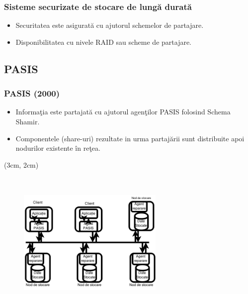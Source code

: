 \documentclass{beamer}
\theoremstyle{definition}
\begin{document}
\begin{frame}
    \frametitle{Sisteme securizate de stocare de lung\u{a} durat\u{a}}
    \begin{itemize}
        \item Securitatea este asigurat\u{a} cu ajutorul schemelor de partajare.
        \pause
        \item Disponibilitatea cu nivele RAID sau scheme de partajare. 
    \end{itemize}
\end{frame}


\subsection{PASIS}

\begin{frame}
    \frametitle{PASIS (2000)}
     {
        \begin{itemize}
            \item Informa\c{t}ia este partajat\u{a} cu ajutorul agen\c{t}ilor PASIS folosind Schema Shamir.
            \pause
            \item Componentele (share-uri) rezultate in urma partaj\u{a}rii sunt distribuite apoi nodurilor existente \^{i}n re\c{t}ea.
        \end{itemize}
    }
     {
         \begin{textblock*}{4cm}(3cm, 2cm)
            \begin{figure}
                \includegraphics[width=7cm,height=7cm,keepaspectratio]{img/raid/PASIS.png}
           \end{figure}
        \end{textblock*}
    }
\end{frame}
\end{document}

